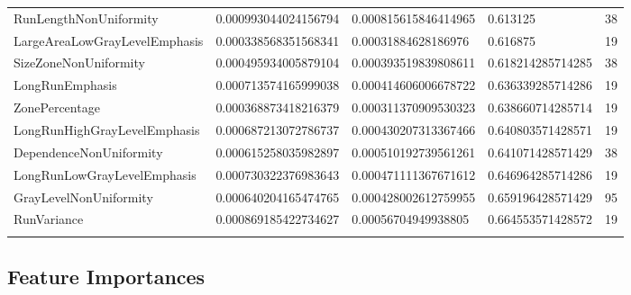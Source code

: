 {\begin{xltabular}[H]{\textwidth}{X l l l r}
    RunLengthNonUniformity                 & \num{0.000993044024156794} & \num{0.000815615846414965} & \num{0.613125} & 38\\
    LargeAreaLowGrayLevelEmphasis          & \num{0.000338568351568341} & \num{0.00031884628186976}  & \num{0.616875} & 19\\
    SizeZoneNonUniformity                  & \num{0.000495934005879104} & \num{0.000393519839808611} & \num{0.618214285714285} & 38\\
    LongRunEmphasis                        & \num{0.000713574165999038} & \num{0.000414606006678722} & \num{0.636339285714286} & 19\\
    ZonePercentage                         & \num{0.000368873418216379} & \num{0.000311370909530323} & \num{0.638660714285714} & 19\\
    LongRunHighGrayLevelEmphasis           & \num{0.000687213072786737} & \num{0.000430207313367466} & \num{0.640803571428571} & 19\\
    DependenceNonUniformity                & \num{0.000615258035982897} & \num{0.000510192739561261} & \num{0.641071428571429} & 38\\
    LongRunLowGrayLevelEmphasis            & \num{0.000730322376983643} & \num{0.000471111367671612} & \num{0.646964285714286} & 19\\
    GrayLevelNonUniformity                 & \num{0.000640204165474765} & \num{0.000428002612759955} & \num{0.659196428571429} & 95\\
    RunVariance                            & \num{0.000869185422734627} & \num{0.00056704949938805}  & \num{0.664553571428572} & 19\\    
    \vspace{10pt}
  \end{xltabular}
  }

\iffalse
\subsection{Feature Importances}

